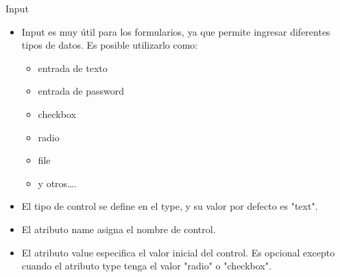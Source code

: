 \documentclass[aspectratio=43,10pt,t]{beamer}
\begin{document}
\begin{frame}{Input}\relax
\begin{minipage}[t]{0.458\paperwidth}
\begingroup
{}
\begin{itemize}
  \item\relax Input es muy útil para los formularios, ya que permite ingresar diferentes tipos de datos. Es posible utilizarlo como: 
  \begin{itemize}
    \item\relax entrada de texto
    \item\relax entrada de password
    \item\relax checkbox
    \item\relax radio
    \item\relax file
    \item\relax y otros…. 
  \end{itemize}
  \item\relax El tipo de control se define en el type, y su valor por defecto es "text".
  \item\relax El atributo name asigna el nombre de control.
  \item\relax El atributo value especifica el valor inicial del control. Es opcional excepto cuando el atributo type tenga el valor "radio" o "checkbox".
\end{itemize}
\endgroup
\end{minipage}
\end{frame}
\end{document}
